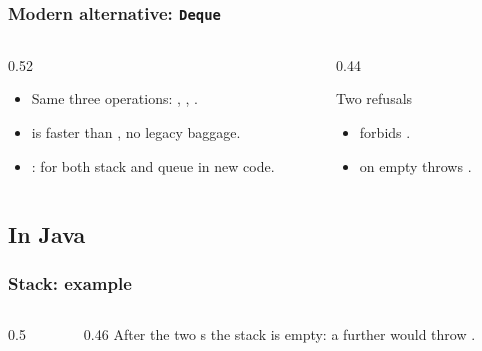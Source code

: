 \documentclass[aspectratio=169,10pt, compress]{beamer}
\begin{document}
\begin{frame}[t,fragile] \frametitle{Modern alternative: \texttt{Deque}}
  \begin{columns}[T]
    \begin{column}{0.52\textwidth}
      \begin{itemize}
        \item Same three operations: , , .
        \item {} is faster than , no legacy baggage.
        \item {}:  for both
              stack and queue in new code.
      \end{itemize}
    \end{column}
    \begin{column}{0.44\textwidth}
      \begin{block}{Two refusals}
        \small
        \begin{itemize}
          \item {} forbids .
          \item {} on empty throws
                .
        \end{itemize}
      \end{block}
    \end{column}
  \end{columns}
\end{frame}

\subsection[Example]{In Java}




\begin{frame}[t,fragile] \frametitle{Stack: example}
  \begin{columns}[T]
    \begin{column}{0.5\textwidth}
    \end{column}
    \begin{column}{0.46\textwidth}
      \small After the two s the stack is empty: a
      further  would throw
      .
    \end{column}
  \end{columns}
\end{frame}
\end{document}
